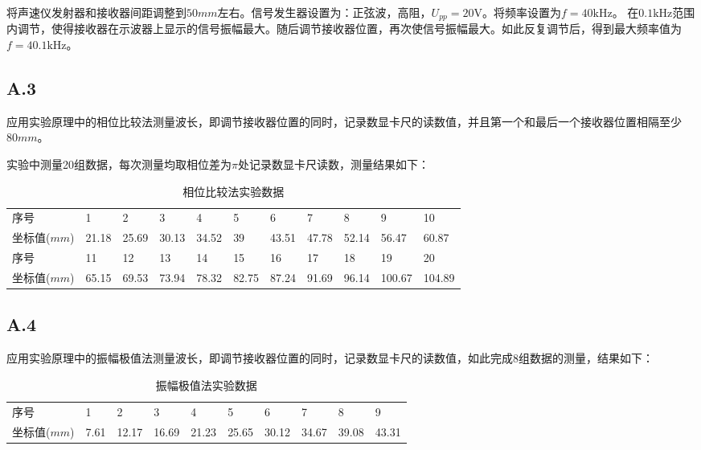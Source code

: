 \documentclass[UTF8,a4paper]{article}%
\begin{document}
将声速仪发射器和接收器间距调整到$50\unit{mm}$左右。信号发生器设置为：正弦波，高阻，$U_{pp}=20\unit{\volt}$。将频率设置为$f=40\unit{\kilo\hertz}$。
在$0.1\unit{\kilo\hertz}$范围内调节，使得接收器在示波器上显示的信号振幅最大。随后调节接收器位置，再次使信号振幅最大。如此反复调节后，得到最大频率值为$f=40.1\unit{\kilo\hertz}$。
\subsection*{A.3}
应用实验原理中的相位比较法测量波长，即调节接收器位置的同时，记录数显卡尺的读数值，并且第一个和最后一个接收器位置相隔至少$80\unit{mm}$。

实验中测量20组数据，每次测量均取相位差为$\pi$处记录数显卡尺读数，测量结果如下：
\begin{table}[H]
    \centering
    \caption{相位比较法实验数据}
    \label{tab:a3}
    \begin{tabular}{lllllllllll}
        \hline
        序号               & 1     & 2     & 3     & 4     & 5     & 6     & 7     & 8     & 9      & 10     \\
        坐标值($\unit{mm}$) & 21.18 & 25.69 & 30.13 & 34.52 & 39    & 43.51 & 47.78 & 52.14 & 56.47  & 60.87  \\
        序号               & 11    & 12    & 13    & 14    & 15    & 16    & 17    & 18    & 19     & 20     \\
        坐标值($\unit{mm}$) & 65.15 & 69.53 & 73.94 & 78.32 & 82.75 & 87.24 & 91.69 & 96.14 & 100.67 & 104.89 \\ \hline
    \end{tabular}
\end{table}
\subsection*{A.4}
应用实验原理中的振幅极值法测量波长，即调节接收器位置的同时，记录数显卡尺的读数值，如此完成8组数据的测量，结果如下：
\begin{table}[H]
    \centering
    \caption{振幅极值法实验数据}
    \label{tab:a4}
    \begin{tabular}{llllllllll}
        \hline
        序号               & 1    & 2     & 3     & 4     & 5     & 6     & 7     & 8     & 9     \\
        坐标值($\unit{mm}$) & 7.61 & 12.17 & 16.69 & 21.23 & 25.65 & 30.12 & 34.67 & 39.08 & 43.31 \\ \hline
    \end{tabular}
\end{table}
\end{document}
